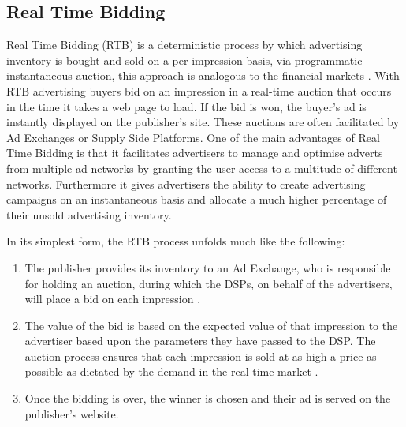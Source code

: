 \documentclass[12pt]{article}
\begin{document}
\subsection{Real Time Bidding}
Real Time Bidding (RTB) is a deterministic process by which advertising inventory is bought and sold on a per-impression basis, via programmatic instantaneous auction, this approach is analogous to the financial markets \parencite{RTB}. With RTB advertising buyers bid on an impression in a real-time auction that occurs in the time it takes a web page to load. If the bid is won, the buyer's ad is instantly displayed on the publisher's site. These auctions are often facilitated by Ad Exchanges or Supply Side Platforms. One of the main advantages of Real Time Bidding is that it facilitates advertisers to manage and optimise adverts from multiple ad-networks by granting the user access to a multitude of different networks. Furthermore it gives advertisers the ability to create advertising campaigns on an instantaneous basis and allocate a much higher percentage of their unsold advertising inventory. \newline

In its simplest form, the RTB process unfolds much like the following: 
\begin{enumerate}
\item The publisher provides its inventory to an Ad Exchange, who is responsible for holding an auction, during which the DSPs, on behalf of the advertisers, will place a bid on each impression \parencite{howRTBWorks}. 
\item The value of the bid is based on the expected value of that impression to the advertiser based upon the parameters they have passed to the DSP. The auction process ensures that each impression is sold at as high a price as possible as dictated by the demand in the real-time market \parencite{howRTBWorks}. 
\item Once the bidding is over, the winner is chosen and their ad is served on the publisher's website. 
\end{enumerate}
\end{document}
